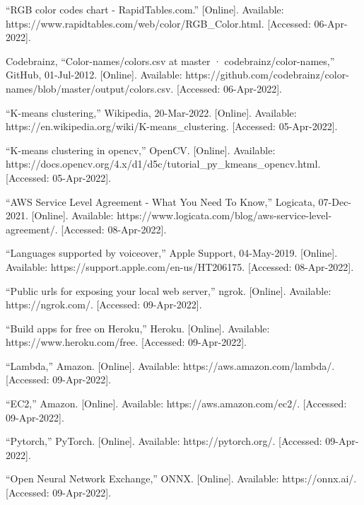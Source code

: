 \documentclass[a4paper,11pt]{article}
\begin{document}
\begin{thebibliography}{9}
“RGB color codes chart - RapidTables.com.” [Online]. Available: https://www.rapidtables.com/web/color/RGB\_Color.html. [Accessed: 06-Apr-2022]. 

Codebrainz, “Color-names/colors.csv at master · codebrainz/color-names,” GitHub, 01-Jul-2012. [Online]. Available: https://github.com/codebrainz/color-names/blob/master/output/colors.csv. [Accessed: 06-Apr-2022]. 

“K-means clustering,” Wikipedia, 20-Mar-2022. [Online]. Available: https://en.wikipedia.org/wiki/K-means\_clustering. [Accessed: 05-Apr-2022].

“K-means clustering in opencv,” OpenCV. [Online]. Available: https://docs.opencv.org/4.x/d1/d5c/tutorial\_py\_kmeans\_opencv.html. [Accessed: 05-Apr-2022]. 

“AWS Service Level Agreement - What You Need To Know,” Logicata, 07-Dec-2021. [Online]. Available: https://www.logicata.com/blog/aws-service-level-agreement/. [Accessed: 08-Apr-2022].

“Languages supported by voiceover,” Apple Support, 04-May-2019. [Online]. Available: https://support.apple.com/en-us/HT206175. [Accessed: 08-Apr-2022]. 

“Public urls for exposing your local web server,” ngrok. [Online]. Available: https://ngrok.com/. [Accessed: 09-Apr-2022]. 

“Build apps for free on Heroku,” Heroku. [Online]. Available: https://www.heroku.com/free. [Accessed: 09-Apr-2022].

“Lambda,” Amazon. [Online]. Available: https://aws.amazon.com/lambda/. [Accessed: 09-Apr-2022]. 

“EC2,” Amazon. [Online]. Available: https://aws.amazon.com/ec2/. [Accessed: 09-Apr-2022].

“Pytorch,” PyTorch. [Online]. Available: https://pytorch.org/. [Accessed: 09-Apr-2022]. 

“Open Neural Network Exchange,” ONNX. [Online]. Available: https://onnx.ai/. [Accessed: 09-Apr-2022]. 


\end{thebibliography}
\end{document}
